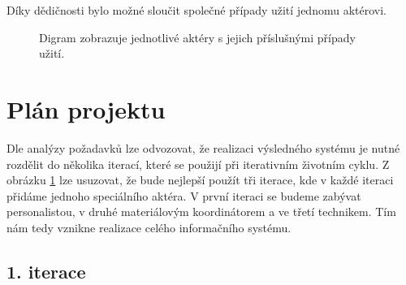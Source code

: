 \documentclass[a4paper,11pt]{article}
\begin{document}
    \noindent
    Díky dědičnosti bylo možné sloučit společné případy užití jednomu aktérovi.

    \begin{figure}[ht]
	\begin{center}
	\end{center}
	\caption{Digram zobrazuje jednotlivé aktéry s jejich příslušnými případy užití.}
	\label{pic1} 
    \end{figure}

    \section*{Plán projektu}

    Dle analýzy požadavků lze odvozovat, že realizaci výsledného systému je nutné rozdělit do několika iterací, které se použijí při iterativním životním cyklu. Z obrázku \ref{pic1} lze usuzovat, že bude nejlepší použít tři iterace, kde v každé iteraci přidáme jednoho speciálního aktéra. V první iteraci se budeme zabývat personalistou, v druhé materiálovým koordinátorem a ve třetí technikem. Tím nám tedy vznikne realizace celého informačního systému. 

    \newpage
    \subsection*{1. iterace}
\end{document}
